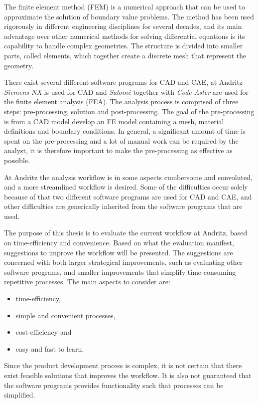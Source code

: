 The finite element method (FEM) is a numerical approach that can be used to approximate the solution of boundary value problems. The method has been used rigorously in different engineering disciplines for several decades, and its main advantage over other numerical methods for solving differential equations is its capability to handle complex geometries. The structure is divided into smaller parts, called elements, which together create a discrete mesh that represent the geometry.~\cite{ottossen92}

There exist several different software programs for CAD and CAE, at Andritz \textit{Siemens NX} is used for CAD and \textit{Salomé} together with \textit{Code Aster} are used for the finite element analysis (FEA). The analysis process is comprised of three steps: pre-processing, solution and post-processing. The goal of the pre-processing is from a CAD model develop an FE model containing a mesh, material definitions and boundary conditions. In general, a significant amount of time is spent on the pre-processing and a lot of manual work can be required by the analyst, it is therefore important to make the pre-processing as effective as possible.

At Andritz the analysis workflow is in some aspects cumbersome and convoluted, and a more streamlined workflow is desired. Some of the difficulties occur solely because of that two different software programs are used for CAD and CAE, and other difficulties are generically inherited from the software programs that are used.

The purpose of this thesis is to evaluate the current workflow at Andritz, based on time-efficiency and convenience. Based on what the evaluation manifest, suggestions to improve the workflow will be presented. The suggestions are concerned with both larger strategical improvements, such as evaluating other software programs, and smaller improvements that simplify time-consuming repetitive processes. The main aspects to consider are:
\begin{itemize}
	\item time-efficiency,
	\item simple and convenient processes,
	\item cost-efficiency and
	\item easy and fast to learn.
\end{itemize}

Since the product development process is complex, it is not certain that there exist feasible solutions that improves the workflow. It is also not guaranteed that the software programs provides functionality such that processes can be simplified.


